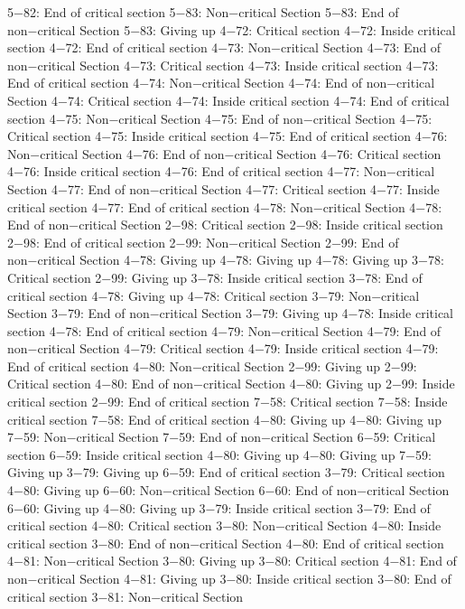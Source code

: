 5−82: End of critical section
5−83: Non−critical Section
5−83: End of non−critical Section
5−83: Giving up
4−72: Critical section
4−72: Inside critical section
4−72: End of critical section
4−73: Non−critical Section
4−73: End of non−critical Section
4−73: Critical section
4−73: Inside critical section
4−73: End of critical section
4−74: Non−critical Section
4−74: End of non−critical Section
4−74: Critical section
4−74: Inside critical section
4−74: End of critical section
4−75: Non−critical Section
4−75: End of non−critical Section
4−75: Critical section
4−75: Inside critical section
4−75: End of critical section
4−76: Non−critical Section
4−76: End of non−critical Section
4−76: Critical section
4−76: Inside critical section
4−76: End of critical section
4−77: Non−critical Section
4−77: End of non−critical Section
4−77: Critical section
4−77: Inside critical section
4−77: End of critical section
4−78: Non−critical Section
4−78: End of non−critical Section
2−98: Critical section
2−98: Inside critical section
2−98: End of critical section
2−99: Non−critical Section
2−99: End of non−critical Section
4−78: Giving up
4−78: Giving up
4−78: Giving up
3−78: Critical section
2−99: Giving up
3−78: Inside critical section
3−78: End of critical section
4−78: Giving up
4−78: Critical section
3−79: Non−critical Section
3−79: End of non−critical Section
3−79: Giving up
4−78: Inside critical section
4−78: End of critical section
4−79: Non−critical Section
4−79: End of non−critical Section
4−79: Critical section
4−79: Inside critical section
4−79: End of critical section
4−80: Non−critical Section
2−99: Giving up
2−99: Critical section
4−80: End of non−critical Section
4−80: Giving up
2−99: Inside critical section
2−99: End of critical section
7−58: Critical section
7−58: Inside critical section
7−58: End of critical section
4−80: Giving up
4−80: Giving up
7−59: Non−critical Section
7−59: End of non−critical Section
6−59: Critical section
6−59: Inside critical section
4−80: Giving up
4−80: Giving up
7−59: Giving up
3−79: Giving up
6−59: End of critical section
3−79: Critical section
4−80: Giving up
6−60: Non−critical Section
6−60: End of non−critical Section
6−60: Giving up
4−80: Giving up
3−79: Inside critical section
3−79: End of critical section
4−80: Critical section
3−80: Non−critical Section
4−80: Inside critical section
3−80: End of non−critical Section
4−80: End of critical section
4−81: Non−critical Section
3−80: Giving up
3−80: Critical section
4−81: End of non−critical Section
4−81: Giving up
3−80: Inside critical section
3−80: End of critical section
3−81: Non−critical Section
